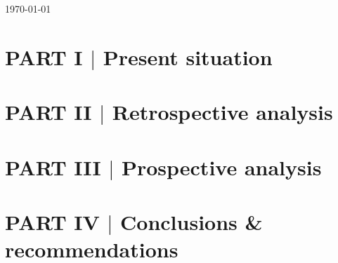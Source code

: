 \documentclass[12pt]{article}
\begin{document}
\begin{titlepage}
{\small
\today %
}
\\[0.2cm] %



\end{titlepage}

\newpage
\tableofcontents

\newpage
\section{PART I $|$ Present situation}



\section{PART II $|$ Retrospective analysis}



\section{PART III $|$ Prospective analysis}



\section{PART IV $|$ Conclusions \& recommendations}





\end{document}
